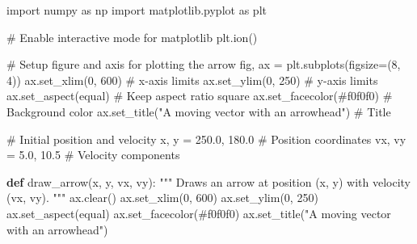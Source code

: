 \documentclass[
  letterpaper,
  DIV=11,
  numbers=noendperiod]{scrreprt}
\newenvironment{Shaded}{\begin{snugshade}}{\end{snugshade}}
\newcommand{\CommentTok}[1]{\textcolor[rgb]{0.37,0.37,0.37}{#1}}
\newcommand{\DecValTok}[1]{\textcolor[rgb]{0.68,0.00,0.00}{#1}}
\newcommand{\FloatTok}[1]{\textcolor[rgb]{0.68,0.00,0.00}{#1}}
\newcommand{\ImportTok}[1]{\textcolor[rgb]{0.00,0.46,0.62}{#1}}
\newcommand{\KeywordTok}[1]{\textcolor[rgb]{0.00,0.23,0.31}{\textbf{#1}}}
\newcommand{\NormalTok}[1]{\textcolor[rgb]{0.00,0.23,0.31}{#1}}
\newcommand{\OperatorTok}[1]{\textcolor[rgb]{0.37,0.37,0.37}{#1}}
\newcommand{\StringTok}[1]{\textcolor[rgb]{0.13,0.47,0.30}{#1}}
\theoremstyle{definition}
\theoremstyle{remark}
\begin{document}
\begin{tcolorbox}[enhanced jigsaw, left=2mm, opacitybacktitle=0.6, toptitle=1mm, colbacktitle=quarto-callout-note-color!10!white, toprule=.15mm, coltitle=black, colframe=quarto-callout-note-color-frame, opacityback=0, title=\textcolor{quarto-callout-note-color}{\faInfo}\hspace{0.5em}{CODE FOR ``moving vector in Python''}, breakable, bottomtitle=1mm, rightrule=.15mm, titlerule=0mm, arc=.35mm, leftrule=.75mm, bottomrule=.15mm, colback=white]

\begin{Shaded}
\begin{Highlighting}[]
\ImportTok{import}\NormalTok{ numpy }\ImportTok{as}\NormalTok{ np}
\ImportTok{import}\NormalTok{ matplotlib.pyplot }\ImportTok{as}\NormalTok{ plt}

\CommentTok{\# Enable interactive mode for matplotlib}
\NormalTok{plt.ion()}

\CommentTok{\# Setup figure and axis for plotting the arrow}
\NormalTok{fig, ax }\OperatorTok{=}\NormalTok{ plt.subplots(figsize}\OperatorTok{=}\NormalTok{(}\DecValTok{8}\NormalTok{, }\DecValTok{4}\NormalTok{))}
\NormalTok{ax.set\_xlim(}\DecValTok{0}\NormalTok{, }\DecValTok{600}\NormalTok{)  }\CommentTok{\# x{-}axis limits}
\NormalTok{ax.set\_ylim(}\DecValTok{0}\NormalTok{, }\DecValTok{250}\NormalTok{)  }\CommentTok{\# y{-}axis limits}
\NormalTok{ax.set\_aspect(}\StringTok{\textquotesingle{}equal\textquotesingle{}}\NormalTok{)  }\CommentTok{\# Keep aspect ratio square}
\NormalTok{ax.set\_facecolor(}\StringTok{\textquotesingle{}\#f0f0f0\textquotesingle{}}\NormalTok{)  }\CommentTok{\# Background color}
\NormalTok{ax.set\_title(}\StringTok{"A moving vector with an arrowhead"}\NormalTok{)  }\CommentTok{\# Title}

\CommentTok{\# Initial position and velocity}
\NormalTok{x, y }\OperatorTok{=} \FloatTok{250.0}\NormalTok{, }\FloatTok{180.0}      \CommentTok{\# Position coordinates}
\NormalTok{vx, vy }\OperatorTok{=} \FloatTok{5.0}\NormalTok{, }\FloatTok{10.5}        \CommentTok{\# Velocity components}


\KeywordTok{def}\NormalTok{ draw\_arrow(x, y, vx, vy):}
    \CommentTok{"""}
\CommentTok{    Draws an arrow at position (x, y) with velocity (vx, vy).}
\CommentTok{    """}
\NormalTok{    ax.clear()}
\NormalTok{    ax.set\_xlim(}\DecValTok{0}\NormalTok{, }\DecValTok{600}\NormalTok{)}
\NormalTok{    ax.set\_ylim(}\DecValTok{0}\NormalTok{, }\DecValTok{250}\NormalTok{)}
\NormalTok{    ax.set\_aspect(}\StringTok{\textquotesingle{}equal\textquotesingle{}}\NormalTok{)}
\NormalTok{    ax.set\_facecolor(}\StringTok{\textquotesingle{}\#f0f0f0\textquotesingle{}}\NormalTok{)}
\NormalTok{    ax.set\_title(}\StringTok{"A moving vector with an arrowhead"}\NormalTok{)}


\end{Highlighting}
\end{Shaded}
\end{tcolorbox}
\end{document}
